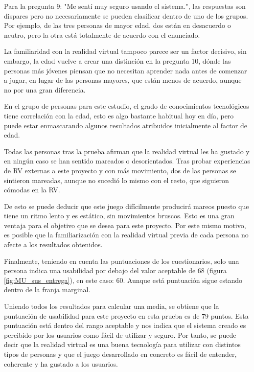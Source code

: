Para la pregunta 9: "Me sentí muy seguro usando el sistema.", las respuestas son dispares pero no necesariamente se pueden clasificar dentro de uno de los grupos. Por ejemplo, de las tres personas de mayor edad, dos están en desacuerdo o neutro, pero la otra está totalmente de acuerdo con el enunciado.

La familiaridad con la realidad virtual tampoco parece ser un factor decisivo, sin embargo, la edad vuelve a crear una distinción en la pregunta 10, dónde las personas más jóvenes piensan que no necesitan aprender nada antes de comenzar a jugar, en lugar de las personas mayores, que están menos de acuerdo, aunque no por una gran diferencia.

En el grupo de personas para este estudio, el grado de conocimientos tecnológicos tiene correlación con la edad, esto es algo bastante habitual hoy en día, pero puede estar enmascarando algunos resultados atribuidos inicialmente al factor de edad.

Todas las personas tras la prueba afirman que la realidad virtual les ha gustado y en ningún caso se han sentido mareados o desorientados. Tras probar experiencias de RV externas a este proyecto y con más movimiento, dos de las personas se sintieron mareadas, aunque no sucedió lo mismo con el resto, que siguieron cómodas en la RV. 

De esto se puede deducir que este juego difícilmente producirá mareos puesto que tiene un ritmo lento y es estático, sin movimientos bruscos. Esto es una gran ventaja para el objetivo que se desea para este proyecto. Por este mismo motivo, es posible que la familiarización con la realidad virtual previa de cada persona no afecte a los resultados obtenidos.

Finalmente, teniendo en cuenta las puntuaciones de los cuestionarios, solo una persona indica una usabilidad  por debajo del valor aceptable de 68 (figura \ref{fig:MU_sus_entrega}), en este caso: 60. Aunque está puntuación sigue estando dentro de la franja marginal. 

Uniendo todos los resultados para calcular una media, se obtiene que la puntuación de usabilidad para este proyecto en esta prueba es de 79 puntos. Esta puntuación está dentro del rango aceptable y nos indica que el sistema creado es percibido por los usuarios como fácil de utilizar y seguro. Por tanto, se puede decir que la realidad virtual es una buena tecnología para utilizar con distintos tipos de personas y que el juego desarrollado en concreto es fácil de entender, coherente y ha gustado a los usuarios.

